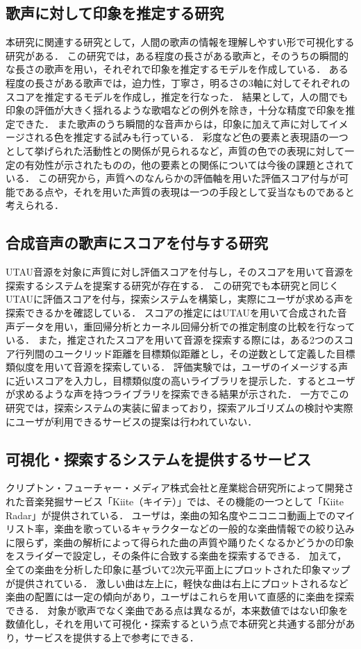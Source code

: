 \documentclass[a4j,8pt,twocolumn]{extarticle}
\begin{document}
\subsection{歌声に対して印象を推定する研究}
本研究に関連する研究として，人間の歌声の情報を理解しやすい形で可視化する研究\cite{impression}\cite{ama}がある．
この研究では，ある程度の長さがある歌声と，そのうちの瞬間的な長さの歌声を用い，それぞれで印象を推定するモデルを作成している．
ある程度の長さがある歌声では，迫力性，丁寧さ，明るさの3軸に対してそれぞれのスコアを推定するモデルを作成し，推定を行なった．
結果として，人の間でも印象の評価が大きく揺れるような歌唱などの例外を除き，十分な精度で印象を推定できた．
また歌声のうち瞬間的な音声からは，印象に加えて声に対してイメージされる色を推定する試みも行っている．
彩度など色の要素と表現語の一つとして挙げられた活動性との関係が見られるなど，声質の色での表現に対して一定の有効性が示されたものの，他の要素との関係については今後の課題とされている．
この研究から，声質へのなんらかの評価軸を用いた評価スコア付与が可能である点や，それを用いた声質の表現は一つの手段として妥当なものであると考えられる．

\subsection{合成音声の歌声にスコアを付与する研究}
UTAU音源を対象に声質に対し評価スコアを付与し，そのスコアを用いて音源を探索するシステムを提案する研究\cite{ong}が存在する．
この研究でも本研究と同じくUTAUに評価スコアを付与，探索システムを構築し，実際にユーザが求める声を探索できるかを確認している．
スコアの推定にはUTAUを用いて合成された音声データを用い，重回帰分析とカーネル回帰分析での推定制度の比較を行なっている．
また，推定されたスコアを用いて音源を探索する際には，ある2つのスコア行列間のユークリッド距離を目標類似距離とし，その逆数として定義した目標類似度を用いて音源を探索している．
評価実験では，ユーザのイメージする声に近いスコアを入力し，目標類似度の高いライブラリを提示した．するとユーザが求めるような声を持つライブラリを探索できる結果が示された．
一方でこの研究では，探索システムの実装に留まっており，探索アルゴリズムの検討や実際にユーザが利用できるサービスの提案は行われていない．

\subsection{可視化・探索するシステムを提供するサービス}
クリプトン・フューチャー・メディア株式会社と産業総合研究所によって開発された音楽発掘サービス「Kiite（キイテ）」では、その機能の一つとして「Kiite Radar」が提供されている\cite{kiite}．
ユーザは，楽曲の知名度やニコニコ動画上でのマイリスト率，楽曲を歌っているキャラクターなどの一般的な楽曲情報での絞り込みに限らず，楽曲の解析によって得られた曲の声質や踊りたくなるかどうかの印象をスライダーで設定し，その条件に合致する楽曲を探索するできる．
加えて，全ての楽曲を分析した印象に基づいて2次元平面上にプロットされた印象マップが提供されている．
激しい曲は左上に，軽快な曲は右上にプロットされるなど楽曲の配置には一定の傾向があり，ユーザはこれらを用いて直感的に楽曲を探索できる．
対象が歌声でなく楽曲である点は異なるが，本来数値ではない印象を数値化し，それを用いて可視化・探索するという点で本研究と共通する部分があり，サービスを提供する上で参考にできる．
\end{document}
